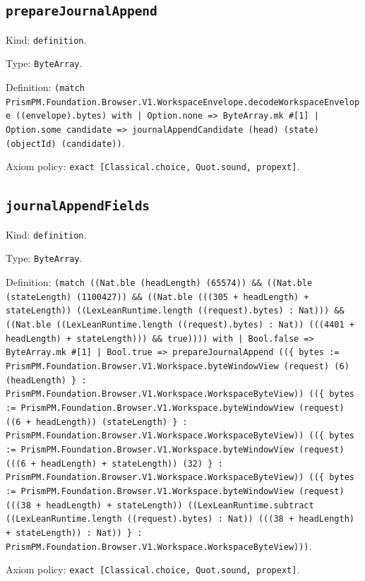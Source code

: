 \documentclass[11pt]{article}
\begin{document}
\subsection*{\texttt{prepareJournalAppend}}
\noindent Kind: \texttt{definition}.\par
\noindent Type: \texttt{ByteArray}.\par
\noindent Definition: \texttt{(match PrismPM.Foundation.Browser.V1.WorkspaceEnvelope.decodeWorkspaceEnvelope ((envelope).bytes) with | Option.none => ByteArray.mk \#[1] | Option.some candidate => journalAppendCandidate (head) (state) (objectId) (candidate))}.\par
\noindent Axiom policy: \texttt{exact [Classical.choice, Quot.sound, propext]}.\par
\subsection*{\texttt{journalAppendFields}}
\noindent Kind: \texttt{definition}.\par
\noindent Type: \texttt{ByteArray}.\par
\noindent Definition: \texttt{(match ((Nat.ble (headLength) (65574)) \&\& ((Nat.ble (stateLength) (1100427)) \&\& ((Nat.ble (((305 + headLength) + stateLength)) ((LexLeanRuntime.length ((request).bytes) : Nat))) \&\& ((Nat.ble ((LexLeanRuntime.length ((request).bytes) : Nat)) (((4401 + headLength) + stateLength))) \&\& true)))) with | Bool.false => ByteArray.mk \#[1] | Bool.true => prepareJournalAppend ((\{ bytes := PrismPM.Foundation.Browser.V1.Workspace.byteWindowView (request) (6) (headLength) \} : PrismPM.Foundation.Browser.V1.Workspace.WorkspaceByteView)) ((\{ bytes := PrismPM.Foundation.Browser.V1.Workspace.byteWindowView (request) ((6 + headLength)) (stateLength) \} : PrismPM.Foundation.Browser.V1.Workspace.WorkspaceByteView)) ((\{ bytes := PrismPM.Foundation.Browser.V1.Workspace.byteWindowView (request) (((6 + headLength) + stateLength)) (32) \} : PrismPM.Foundation.Browser.V1.Workspace.WorkspaceByteView)) ((\{ bytes := PrismPM.Foundation.Browser.V1.Workspace.byteWindowView (request) (((38 + headLength) + stateLength)) ((LexLeanRuntime.subtract ((LexLeanRuntime.length ((request).bytes) : Nat)) (((38 + headLength) + stateLength)) : Nat)) \} : PrismPM.Foundation.Browser.V1.Workspace.WorkspaceByteView)))}.\par
\noindent Axiom policy: \texttt{exact [Classical.choice, Quot.sound, propext]}.\par
\end{document}
